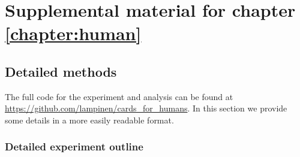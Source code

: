 \chapter{Supplemental material for chapter \ref{chapter:human}} \label{appendix:human}

\section{Detailed methods}
The full code for the experiment and analysis can be found at \url{https://github.com/lampinen/cards_for_humans}. In this section we provide some details in a more easily readable format.

\subsection{Detailed experiment outline}

